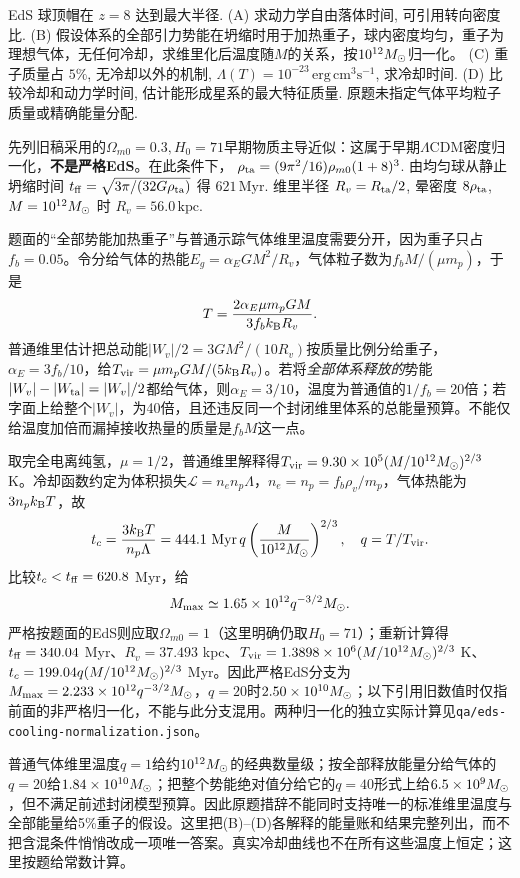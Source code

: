 \begin{exercise}
EdS 球顶帽在 $z=8$ 达到最大半径.
(A) 求动力学自由落体时间, 可引用转向密度比.
(B) 假设体系的全部引力势能在坍缩时用于加热重子，球内密度均匀，重子为理想气体，无任何冷却，求维里化后温度随$M$的关系，按$10^{12}M_{\odot}$归一化。
(C) 重子质量占 $5\%$, 无冷却以外的机制, $\Lambda(T)=10^{-23}\,\mathrm{erg\,cm^3s^{-1}}$, 求冷却时间.
(D) 比较冷却和动力学时间, 估计能形成星系的最大特征质量. 原题未指定气体平均粒子质量或精确能量分配.
\end{exercise}
\begin{solution}
先列旧稿采用的$\Omega_{m0}=0.3,H_0=71$早期物质主导近似：这属于早期$\Lambda$CDM密度归一化，\textbf{不是严格EdS}。在此条件下， $\rho_{\rm ta}=(9\pi^2/16)\rho_{m0}(1+8)^3$. 由均匀球从静止坍缩时间 $t_{\rm ff}=\sqrt{3\pi/(32G\rho_{\rm ta})}$ 得 $621\,\mathrm{Myr}$. 维里半径 $R_v=R_{\rm ta}/2$, 晕密度 $8\rho_{\rm ta}$, $M=10^{12}M_{\odot}$ 时 $R_v=56.0\,\mathrm{kpc}$.

题面的“全部势能加热重子”与普通示踪气体维里温度需要分开，因为重子只占$f_b=0.05$。令分给气体的热能$E_g=\alpha_E GM^2/R_v$，气体粒子数为$f_bM/(\mu m_p)$，于是
\[
 T=\frac{2\alpha_E\mu m_pGM}{3f_bk_{\mathrm B} R_v}.
\]
普通维里估计把总动能$|W_v|/2=3GM^2/(10R_v)$按质量比例分给重子，$\alpha_E=3f_b/10$，给$T_{ \rm vir}=\mu m_pGM/(5k_{\mathrm B} R_v)$。若将\emph{全部体系释放的}势能$|W_v|-|W_{ \rm ta}|=|W_v|/2$都给气体，则$\alpha_E=3/10$，温度为普通值的$1/f_b=20$倍；若字面上给整个$|W_v|$，为40倍，且还违反同一个封闭维里体系的总能量预算。不能仅给温度加倍而漏掉接收热量的质量是$f_bM$这一点。

取完全电离纯氢，$\mu=1/2$，普通维里解释得$T_{ \rm vir}=9.30\times10^5(M/10^{12}M_{\odot})^{2/3}$ K。冷却函数约定为体积损失$\mathcal L=n_en_p\Lambda$，$n_e=n_p=f_b\rho_v/m_p$，气体热能为$3n_pk_{\mathrm B} T$，故
\[
 t_c=\frac{3k_{\mathrm B} T}{n_p\Lambda}
 =444.1\ \mathrm{Myr}\,q\left(\frac{M}{10^{12}M_{\odot}}\right)^{2/3},
 \quad q=T/T_{ \rm vir}.
\]
比较$t_c<t_{ \rm ff}=620.8$ Myr，给
\[
 M_{ \rm max}\simeq1.65\times10^{12}q^{-3/2}M_{\odot}.
\]
严格按题面的EdS则应取$\Omega_{m0}=1$（这里明确仍取$H_0=71$）；重新计算得$t_{\rm ff}=340.04$ Myr、$R_v=37.493$ kpc、$T_{\rm vir}=1.3898\times10^6(M/10^{12}M_{\odot})^{2/3}$ K、$t_c=199.04q(M/10^{12}M_{\odot})^{2/3}$ Myr。因此严格EdS分支为$M_{\max}=2.233\times10^{12}q^{-3/2}M_{\odot}$，$q=20$时$2.50\times10^{10}M_{\odot}$；以下引用旧数值时仅指前面的非严格归一化，不能与此分支混用。两种归一化的独立实际计算见\texttt{qa/eds-cooling-normalization.json}。

普通气体维里温度$q=1$给约$10^{12}M_{\odot}$的经典数量级；按全部释放能量分给气体的$q=20$给$1.84\times10^{10}M_{\odot}$；把整个势能绝对值分给它的$q=40$形式上给$6.5\times10^9M_{\odot}$，但不满足前述封闭模型预算。因此原题措辞不能同时支持唯一的标准维里温度与全部能量给5\%重子的假设。这里把(B)--(D)各解释的能量账和结果完整列出，而不把含混条件悄悄改成一项唯一答案。真实冷却曲线也不在所有这些温度上恒定；这里按题给常数计算。
\end{solution}

